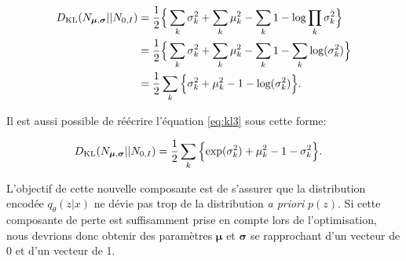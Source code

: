 \begin{equation}  \label{eq:kl3}
\DIFdelbegin %
\DIFdelend \DIFaddbegin \begin{aligned}
D_{\text{KL}}(N_{\boldsymbol \mu, \boldsymbol \sigma} || N_{0,I}) &=  \frac{1}{2}\Big\{\sum_k \sigma_{k}^2+ \sum_{k}\mu_{k}^2 - \sum_{k} 1 - \text{log} \prod_{k}\sigma_{k}^2\Big \} \\
&=\frac{1}{2}\Big\{\sum_k \sigma_{k}^2+ \sum_{k}\mu_{k}^2 - \sum_{k} 1 - \sum_{k} \text{log} (\sigma_{k}^2)\Big \} \\
&=\frac{1}{2} \sum_{k}\Big\{\sigma_{k}^2 + \mu_{k}^2 - 1 - \text{log}(\sigma_{k}^2)\Big\}.
\end{aligned}\DIFaddend 
\end{equation}

Il est aussi possible de réécrire l'équation \ref{eq:kl3} sous cette forme:

\begin{equation}  \label{eq:kl4}
\DIFdelbegin %
\DIFdelend \DIFaddbegin \begin{aligned}
D_{\text{KL}}(N_{\boldsymbol \mu, \boldsymbol \sigma} || N_{0,I}) &= \frac{1}{2} \sum_{k}\Big\{\text{exp}(\sigma_{k}^2) + \mu_{k}^2 - 1 - \sigma_{k}^2\Big\}.
\end{aligned}\DIFaddend 
\end{equation}


 L'objectif de cette nouvelle composante est de s'assurer que la distribution encodée $q_{\theta}(z|x)$ ne dévie pas trop de la distribution \textit{a priori} $p(z)$. Si cette composante de perte est suffisamment prise en compte lors de l'optimisation, nous devrions donc obtenir des paramètres $\boldsymbol{\mu}$ et $\boldsymbol{\sigma}$ se rapprochant d'un vecteur de 0 et d'un vecteur de 1.

